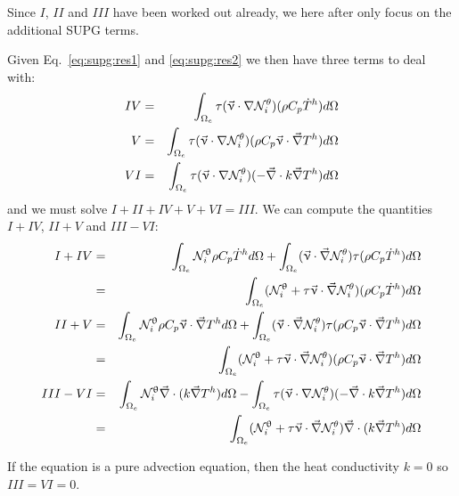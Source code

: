 Since $I$, $II$ and $III$ have been worked out already, 
we here after only focus on the additional SUPG terms. 
  
Given Eq.~\eqref{eq:supg:res1} and \eqref{eq:supg:res2} we then have three terms to deal with:
\begin{eqnarray}
IV &=&\int_{\Omega_e} \tau(\vec\upnu\cdot\nabla {\mathcal{N}}_i^\theta) (\rho C_p\dot{T}^h)  d\Omega \\
V  &=&\int_{\Omega_e} \tau(\vec\upnu\cdot\nabla {\mathcal{N}}_i^\theta)(\rho C_p{\vec \upnu}\cdot{\vec\nabla T^h}) d\Omega \\
VI &=&\int_{\Omega_e} \tau(\vec\upnu\cdot\nabla {\mathcal{N}}_i^\theta)(-{\vec \nabla} \cdot k \vec\nabla T^h ) d\Omega 
\end{eqnarray}
and we must solve $I + II + IV + V + VI = III$. 
We can compute the quantities $I+IV$, $II+V$ and $III-VI$:
\begin{eqnarray}
I+IV 
&=&
\int_{\Omega_e} {\mathcal{N}}^\uptheta_i  \rho C_p \dot{T}^h d\Omega 
+
\int_{\Omega_e}(\vec\upnu\cdot\vec\nabla {\mathcal{N}}_i^\theta)  \tau ( \rho C_p\dot{T}^h)  d\Omega \nonumber\\
&=& 
\int_{\Omega_e} ( {\mathcal{N}}^\uptheta_i + \tau \vec\upnu\cdot\vec\nabla {\mathcal{N}}_i^\theta )  ( \rho C_p\dot{T}^h)  d\Omega 
\\
II+V 
&=&
\int_{\Omega_e} {\mathcal{N}}^\uptheta_i  \rho C_p  {\vec \upnu}\cdot {\vec\nabla T^h}   d\Omega
+
\int_{\Omega_e}(\vec\upnu\cdot\vec\nabla {\mathcal{N}}_i^\theta) \tau (\rho C_p {\vec \upnu}\cdot{\vec\nabla T^h}) d\Omega \nonumber\\
&=& 
\int_{\Omega_e} ({\mathcal{N}}^\uptheta_i  + \tau \vec\upnu\cdot\vec\nabla {\mathcal{N}}_i^\theta) (\rho C_p {\vec \upnu}\cdot{\vec\nabla T^h}) d\Omega \\
III- VI &=& \int_{\Omega_e}  {\mathcal{N}}^\uptheta_i {\vec \nabla} \cdot (k \vec\nabla T^h )d\Omega
- \int_{\Omega_e} \tau(\vec\upnu\cdot\nabla {\mathcal{N}}_i^\theta)(-{\vec \nabla} \cdot k \vec\nabla T^h ) d\Omega \nonumber\\
&=& \int_{\Omega_e}  ({\mathcal{N}}^\uptheta_i    + \tau \vec\upnu\cdot\vec\nabla {\mathcal{N}}_i^\theta) {\vec \nabla}    \cdot (k \vec\nabla T^h )d\Omega
\end{eqnarray}



\begin{remark}
If the equation is a pure advection equation, then the heat conductivity $k=0$ so $III=VI=0$. 
\end{remark}


